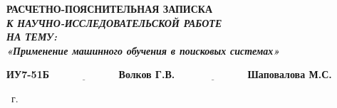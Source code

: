 \begin{titlepage}
	
	\begin{center}
		\Large\textbf{РАСЧЕТНО-ПОЯСНИТЕЛЬНАЯ ЗАПИСКА}\\
		\large\textit{\textbf{К НАУЧНО-ИССЛЕДОВАТЕЛЬСКОЙ РАБОТЕ}}\\
            \large\textbf{\textit{НА ТЕМУ:}}\\
            \textbf{\textit{«Применение машинного обучения в поисковых системах»}}
	\end{center}\vspace{2cm}

	
	\hspace{1cm}\textbf{ИУ7-51Б}\hfill$\underline{\text{~~~~~~~~~~~~~~~~~~~~~}}$\>\textbf{Волков Г.В.}\>\>\>\>\>\>\>\>\>\>\>\>\>\>\>\newline\newline
	\hspace{1cm}\hfill$\underline{\text{~~~~~~~~~~~~~~~~~~~~~}}$\>\textbf{Шаповалова М.С.}\newline\newline
	
	\begin{center}
		\vfill
		\the\year
		~г.
	\end{center}
\end{titlepage}
